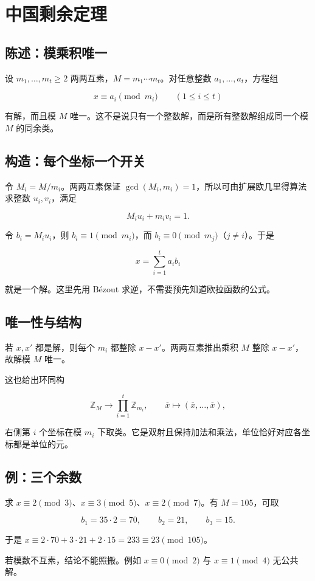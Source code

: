 \section{中国剩余定理}


\subsection{陈述：模乘积唯一}


设 $m_1,\ldots,m_t\ge2$ 两两互素，$M=m_1\cdots m_t$。对任意整数 $a_1,\ldots,a_t$，方程组

\[
x\equiv a_i\pmod{m_i}\qquad(1\le i\le t)
\]

有解，而且模 $M$ 唯一。这不是说只有一个整数解，而是所有整数解组成同一个模 $M$ 的同余类。

\subsection{构造：每个坐标一个开关}


令 $M_i=M/m_i$。两两互素保证 $\gcd(M_i,m_i)=1$，所以可由扩展欧几里得算法求整数 $u_i,v_i$，满足

\[
M_i u_i+m_i v_i=1.
\]

令 $b_i=M_i u_i$，则 $b_i\equiv1\pmod{m_i}$，而 $b_i\equiv0\pmod{m_j}$（$j\ne i$）。于是

\[
x=\sum_{i=1}^t a_i b_i
\]

就是一个解。这里先用 Bézout 求逆，不需要预先知道欧拉函数的公式。

\subsection{唯一性与结构}


若 $x,x'$ 都是解，则每个 $m_i$ 都整除 $x-x'$。两两互素推出乘积 $M$ 整除 $x-x'$，故解模 $M$ 唯一。

这也给出环同构

\[
\mathbb Z_M\longrightarrow\prod_{i=1}^t\mathbb Z_{m_i},\qquad
\overline x\longmapsto(\overline x,\ldots,\overline x),
\]

右侧第 $i$ 个坐标在模 $m_i$ 下取类。它是双射且保持加法和乘法，单位恰好对应各坐标都是单位的元。

\subsection{例：三个余数}


求 $x\equiv2\pmod3$、$x\equiv3\pmod5$、$x\equiv2\pmod7$。有 $M=105$，可取

\[
b_1=35\cdot2=70,\qquad b_2=21,\qquad b_3=15.
\]

于是 $x\equiv2\cdot70+3\cdot21+2\cdot15=233\equiv23\pmod{105}$。

若模数不互素，结论不能照搬。例如 $x\equiv0\pmod2$ 与 $x\equiv1\pmod4$ 无公共解。
